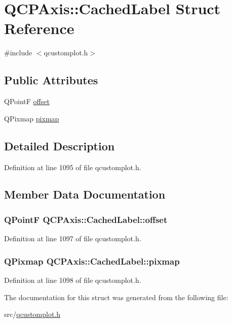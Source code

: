 \hypertarget{struct_q_c_p_axis_1_1_cached_label}{\section{Q\-C\-P\-Axis\-:\-:Cached\-Label Struct Reference}
\label{struct_q_c_p_axis_1_1_cached_label}
}


{\ttfamily \#include $<$qcustomplot.\-h$>$}

\subsection*{Public Attributes}
\begin{DoxyCompactItemize}
\item 
Q\-Point\-F \hyperlink{struct_q_c_p_axis_1_1_cached_label_ae21e729074856ca4b181856caf3b9ed4}{offset}
\item 
Q\-Pixmap \hyperlink{struct_q_c_p_axis_1_1_cached_label_a8d6abec205727542eb99910307314fcc}{pixmap}
\end{DoxyCompactItemize}


\subsection{Detailed Description}


Definition at line 1095 of file qcustomplot.\-h.



\subsection{Member Data Documentation}
\hypertarget{struct_q_c_p_axis_1_1_cached_label_ae21e729074856ca4b181856caf3b9ed4}{
\subsubsection[{offset}]{\setlength{\rightskip}{0pt plus 5cm}Q\-Point\-F Q\-C\-P\-Axis\-::\-Cached\-Label\-::offset}}\label{struct_q_c_p_axis_1_1_cached_label_ae21e729074856ca4b181856caf3b9ed4}


Definition at line 1097 of file qcustomplot.\-h.

\hypertarget{struct_q_c_p_axis_1_1_cached_label_a8d6abec205727542eb99910307314fcc}{
\subsubsection[{pixmap}]{\setlength{\rightskip}{0pt plus 5cm}Q\-Pixmap Q\-C\-P\-Axis\-::\-Cached\-Label\-::pixmap}}\label{struct_q_c_p_axis_1_1_cached_label_a8d6abec205727542eb99910307314fcc}


Definition at line 1098 of file qcustomplot.\-h.



The documentation for this struct was generated from the following file\-:\begin{DoxyCompactItemize}
\item 
src/\hyperlink{qcustomplot_8h}{qcustomplot.\-h}\end{DoxyCompactItemize}
